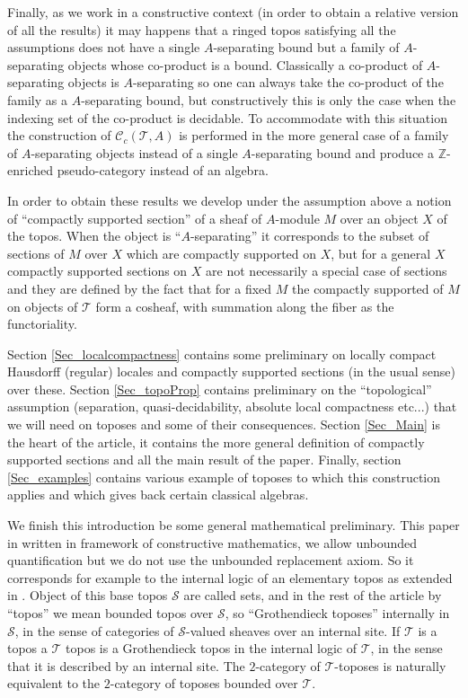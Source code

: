 \documentclass[a4paper]{article}
\newcommand{\Tcal}{\mathcal{T}}
\newcommand{\Scal}{\mathcal{S}}
\newcommand{\Ccal}{\mathcal{C}}
\newcommand{\blockn}[1]{\par #1 \bigskip}
\begin{document}
\blockn{Finally, as we work in a constructive context (in order to obtain a relative version of all the results) it may happens that a ringed topos satisfying all the assumptions does not have a single $A$-separating bound but a family of $A$-separating objects whose co-product is a bound. Classically a co-product of $A$-separating objects is $A$-separating so one can always take the co-product of the family as a $A$-separating bound, but constructively this is only the case when the indexing set of the co-product is decidable. To accommodate with this situation the construction of $\Ccal_c(\Tcal,A)$ is performed in the more general case of a family of $A$-separating objects instead of a single $A$-separating bound and produce a $\mathbb{Z}$-enriched pseudo-category instead of an algebra. }

\blockn{In order to obtain these results we develop under the assumption above a notion of ``compactly supported section'' of a sheaf of $A$-module $M$ over an object $X$ of the topos. When the object is ``$A$-separating'' it corresponds to the subset of sections of $M$ over $X$ which are compactly supported on $X$, but for a general $X$ compactly supported sections on $X$ are not necessarily a special case of sections and they are defined by the fact that for a fixed $M$ the compactly supported of $M$ on objects of $\Tcal$ form a cosheaf, with summation along the fiber as the functoriality.}


\blockn{Section \ref{Sec_localcompactness} contains some preliminary on locally compact Hausdorff (regular) locales and compactly supported sections (in the usual sense) over these. Section \ref{Sec_topoProp} contains preliminary on the ``topological'' assumption (separation, quasi-decidability, absolute local compactness etc...) that we will need on toposes and some of their consequences. Section \ref{Sec_Main} is the heart of the article, it contains the more general definition of compactly supported sections and all the main result of the paper. Finally, section \ref{Sec_examples} contains various example of toposes to which this construction applies and which gives back certain classical algebras.}



\blockn{We finish this introduction be some general mathematical preliminary. This paper in written in framework of constructive mathematics, we allow unbounded quantification but we do not use the unbounded replacement axiom. So it corresponds for example to the internal logic of an elementary topos as extended in \cite{shulman2010stack}. Object of this base topos $\Scal$ are called sets, and in the rest of the article by ``topos'' we mean bounded topos over $\Scal$, so ``Grothendieck toposes'' internally in $\Scal$, in the sense of categories of $\Scal$-valued sheaves over an internal site. If $\Tcal$ is a topos a  $\Tcal$ topos is a Grothendieck topos in the internal logic of $\Tcal$, in the sense that it is described by an internal site. The $2$-category of $\Tcal$-toposes is naturally equivalent to the $2$-category of toposes bounded over $\Tcal$.}
\end{document}
